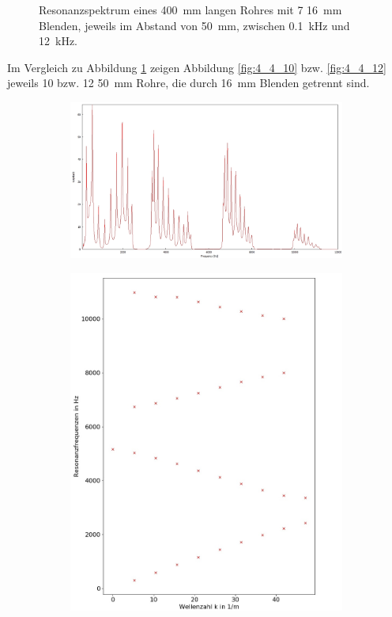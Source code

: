 \begin{figure}
\begin{subfigure}{0.34\textwidth}
\end{subfigure}
\caption{Resonanzspektrum eines 400~mm langen Rohres mit 7 16~mm Blenden, jeweils im Abstand von 50~mm, zwischen 0.1~kHz und 12~kHz.}
\label{fig:4_3_16}
\end{figure}

Im Vergleich zu Abbildung \ref{fig:4_3_16} zeigen Abbildung \ref{fig:4_4_10} bzw. \ref{fig:4_4_12} jeweils 10 bzw. 12 50~mm Rohre, die durch 16~mm Blenden getrennt sind.
\begin{figure}
\centering
\begin{subfigure}{0.65\textwidth}
\includegraphics[width=\textwidth]{content/messungen/Chapter4/4_4_10x50.jpg}
\end{subfigure}
\begin{subfigure}{0.34\textwidth}
\includegraphics[width=\textwidth]{content/Scripts/4_4_10_red.jpg}

\end{subfigure}
\end{figure}
